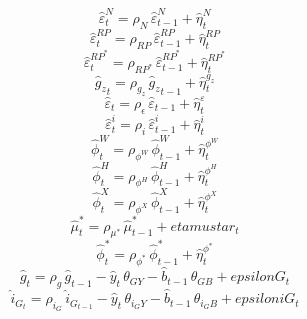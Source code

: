 \begin{dmath}
{\hat{\varepsilon}^N_{t}}={\rho_{N}}\, {\hat{\varepsilon}^N_{t-1}}+{\hat{\eta}^{N}_{t}}
\end{dmath}
\begin{dmath}
{\hat{\varepsilon}^{RP}_{t}}={\rho_{RP}}\, {\hat{\varepsilon}^{RP}_{t-1}}+{\hat{\eta}^{RP}_{t}}
\end{dmath}
\begin{dmath}
{\hat{\varepsilon}^{RP^*}_{t}}={\rho_{RP^*}}\, {\hat{\varepsilon}^{RP^*}_{t-1}}+{\hat{\eta}^{RP^*}_{t}}
\end{dmath}
\begin{dmath}
{{\hat{g}_z}_{t}}={\rho_{g_z}}\, {{\hat{g}_z}_{t-1}}+{\hat{\eta}^{g_z}_{t}}
\end{dmath}
\begin{dmath}
{\hat{\varepsilon}_{t}}={\rho_{\epsilon}}\, {\hat{\varepsilon}_{t-1}}+{\hat{\eta}^{\varepsilon}_{t}}
\end{dmath}
\begin{dmath}
{\hat{\varepsilon}^i_{t}}={\rho_{i}}\, {\hat{\varepsilon}^i_{t-1}}+{\hat{\eta}^{i}_{t}}
\end{dmath}
\begin{dmath}
{\hat{\phi}^W_{t}}={\rho_{\phi^W}}\, {\hat{\phi}^W_{t-1}}+{\hat{\eta}^{\phi^W}_{t}}
\end{dmath}
\begin{dmath}
{\hat{\phi}^H_{t}}={\rho_{\phi^H}}\, {\hat{\phi}^H_{t-1}}+{\hat{\eta}^{\phi^H}_{t}}
\end{dmath}
\begin{dmath}
{\hat{\phi}^X_{t}}={\rho_{\phi^X}}\, {\hat{\phi}^X_{t-1}}+{\hat{\eta}^{\phi^X}_{t}}
\end{dmath}
\begin{dmath}
{\hat{\mu}^*_{t}}={\rho_{\mu^*}}\, {\hat{\mu}^*_{t-1}}+{etamustar_{t}}
\end{dmath}
\begin{dmath}
{\hat{\phi}^*_{t}}={\rho_{\phi^*}}\, {\hat{\phi}^*_{t-1}}+{\hat{\eta}^{\phi^*}_{t}}
\end{dmath}
\begin{dmath}
{\hat{g}_{t}}={\rho_{g}}\, {\hat{g}_{t-1}}-{\hat{y}_{t}}\, {\theta_{GY}}-{\hat{b}_{t-1}}\, {\theta_{GB}}+{epsilonG_{t}}
\end{dmath}
\begin{dmath}
{\hat{i}_G_{t}}={\rho_{i_G}}\, {\hat{i}_G_{t-1}}-{\hat{y}_{t}}\, {\theta_{i_GY}}-{\hat{b}_{t-1}}\, {\theta_{i_GB}}+{epsiloniG_{t}}
\end{dmath}

